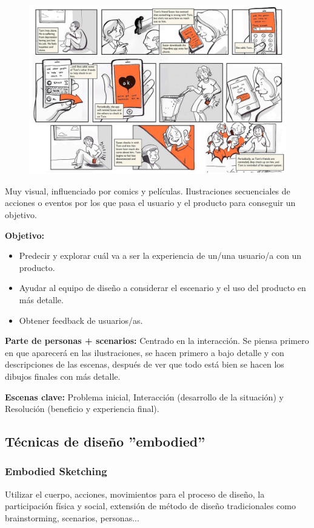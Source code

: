 \documentclass[12pt]{report} %
\begin{document}
\begin{figure}[H]
	{\includegraphics[scale=.4]{2021-03-20 23_53_31-L5.pdf - Foxit Reader.png}}
\end{figure}

Muy visual, influenciado por comics y películas. Ilustraciones secuenciales de acciones o eventos por los que pasa el usuario y el producto para conseguir un objetivo.

\textbf{Objetivo: }
\begin{itemize}
  \item Predecir y explorar cuál va a ser la experiencia de un/una usuario/a con un producto.
  \item Ayudar al equipo de diseño a considerar el escenario y el uso del producto en más detalle.
  \item Obtener feedback de usuarios/as.
\end{itemize}

\textbf{Parte de personas + scenarios:} Centrado en la interacción. Se piensa primero en que aparecerá en las ilustraciones, se hacen primero a bajo detalle y con descripciones de las escenas, después de ver que todo está bien se hacen los dibujos finales con más detalle.

\textbf{Escenas clave:} Problema inicial, Interacción (desarrollo de la situación) y Resolución (beneficio y experiencia final).

\subsection{Técnicas de diseño ”embodied”}
\subsubsection{Embodied Sketching}
Utilizar el cuerpo, acciones, movimientos para el proceso de diseño, la participación física y social, extensión de método de diseño tradicionales como brainstorming, scenarios, personas...
\end{document}
